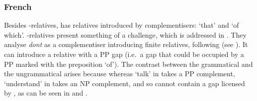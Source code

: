 \documentclass[output=paper,biblatex,babelshorthands,newtxmath,draftmode,colorlinks,citecolor=brown]{langscibook}
\begin{document}
\subsubsection{French}
\label{sec:rc-french}
\largerpage
Besides -relatives,  has relatives introduced by complementisers:
 `that' and  `of which'. -relatives present
something of a challenge, which is addressed in . They analyse \emph{dont} as a complementiser introducing finite relatives, following \citet{godard92f}
(see \eguk \citealt[Section~2.1]{AG2007a-u}). It can introduce a relative with a PP gap (i.e.\ a gap
that could be occupied by a PP marked with the preposition
 `of'). The contrast between the grammatical  and the
ungrammatical  arises because whereas  `talk' in  takes
a PP complement,  `understand' in
 takes an NP complement, and so cannot contain a gap licensed by
, as can be seen in  and .
\begin{exe}\ex\begin{xlist}\label{x:rc-69}
  \label{x:rc-70}
  \label{x:rc-71}
\end{xlist}\end{exe}
\begin{exe}\ex\begin{xlist}\label{x:rc-168}
  \label{x:rc-169}
  \label{x:rc-170}
\end{xlist}\end{exe}
\end{document}
